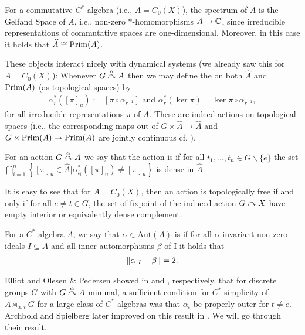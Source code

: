 \begin{remark}
	For a commutative $C^*$-algebra (i.e., $A = C_0(X)$), the spectrum of $A$ is the Gelfand Space of $A$, i.e., non-zero $*$-homomorphisms $A \to \mathbb{C}$, since irreducible representations of commutative spaces are one-dimensional. Moreover, in this case it holds that $\widehat{A} \cong \mathrm{Prim}(A)$.
\end{remark}
These objects interact nicely with dynamical systems (we already saw this for $A= C_0(X)$): Whenever $G \stackrel{\alpha}{\curvearrowright} A$ then we may define the  on both $\hat A$ and $\mathrm{Prim}(A)$ (as topological spaces) by
\begin{align*}
	\alpha_r^*([\pi]_u) := [\pi \circ \alpha_{r^{-1}}] \text{ and } \alpha_{r}^*(\ker \pi) = \ker \pi \circ \alpha_{r^{-1}},
\end{align*}
for all irreducible representations $\pi$ of $A$. These are indeed actions on topological spaces (i.e., the corresponding maps out of $G \times \hat A \to \hat A$ and $G \times \mathrm{Prim}(A) \to \mathrm{Prim}(A)$ are jointly continuous cf. \cite[Lemma 7.1]{williamsmorita}).
\begin{definition}
	For an action $G \stackrel{\alpha}{\curvearrowright} A$ we say that the action is  if for all $t_1,\dots,t_n \in G\backslash\{e\}$ the set $\bigcap_{i=1}^n \left\{ [\pi]_u \in \hat A | \alpha_{t_i}^*([\pi]_u)\neq [\pi]_u \right\}$ is dense in $\hat A$.
\end{definition}
\begin{remark}
	It is easy to see that for $A=C_0(X)$, then an action is topologically free if and only if for all $e \neq t \in G$, the set of fixpoint of the induced action $G \stackrel{}{\curvearrowright} X$ have empty interior or equivalently dense complement.
\end{remark}
\begin{definition}
	For a $C^*$-algebra $A$, we say that $\alpha \in \mathrm{Aut}(A)$ is  if for all $\alpha$-invariant non-zero ideals $I \subseteq A$ and all inner automorphisms $\beta$ of I it holds that
	\begin{align*}
		\left\lVert \alpha|_I - \beta \right\rVert = 2.
	\end{align*}
\end{definition}
Elliot and Olesen \& Pedersen showed in \cite[Theorem 3.2]{elliott1980some} and \cite[Theorem 7.2]{olesenpedersen3}, respectively, that for discrete groups $G$ with $G \stackrel{\alpha}{\curvearrowright} A$ minimal, a sufficient condition for $C^*$-simplicity of $A \rtimes_{\alpha,r} G$ for a large class of $C^*$-algebras was that $\alpha_t$ be properly outer for $t \neq e$. Archbold and Spielberg later improved on this result in \cite{archbold1994topologically}. We will go through their result. 
